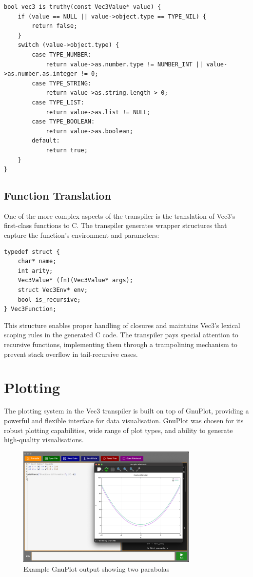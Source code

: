 \begin{verbatim}
bool vec3_is_truthy(const Vec3Value* value) {
    if (value == NULL || value->object.type == TYPE_NIL) {
        return false;
    }
    switch (value->object.type) {
        case TYPE_NUMBER:
            return value->as.number.type != NUMBER_INT || value->as.number.as.integer != 0;
        case TYPE_STRING:
            return value->as.string.length > 0;
        case TYPE_LIST:
            return value->as.list != NULL;
        case TYPE_BOOLEAN:
            return value->as.boolean;
        default:
            return true;
    }
}
\end{verbatim}

\subsection{Function Translation}\label{subsec:function-translation}

One of the more complex aspects of the transpiler is the translation of Vec3's first-class functions to C\@.
The transpiler generates wrapper structures that capture the function's environment and parameters:

\begin{verbatim}
typedef struct {
    char* name;
    int arity;
    Vec3Value* (fn)(Vec3Value* args);
    struct Vec3Env* env;
    bool is_recursive;
} Vec3Function;
\end{verbatim}

This structure enables proper handling of closures and maintains Vec3's lexical scoping rules in the generated C code. 
The transpiler pays special attention to recursive functions, implementing them through a trampolining mechanism to prevent stack overflow in tail-recursive cases.

\section{Plotting}\label{sec:plotting-transpiler}
The plotting system in the Vec3 transpiler is built on top of GnuPlot\citet{gnuPlot}, providing a powerful and flexible 
interface for data visualisation.
GnuPlot was chosen for its robust plotting capabilities, wide range of plot types, and ability to generate 
high-quality visualisations.

\begin{figure}[H]
    \centering
    \includegraphics[width=0.8\textwidth]{assets/gnuplot}
    \caption{Example GnuPlot output showing two parabolas}\label{fig:gnuplot-example}
\end{figure}

